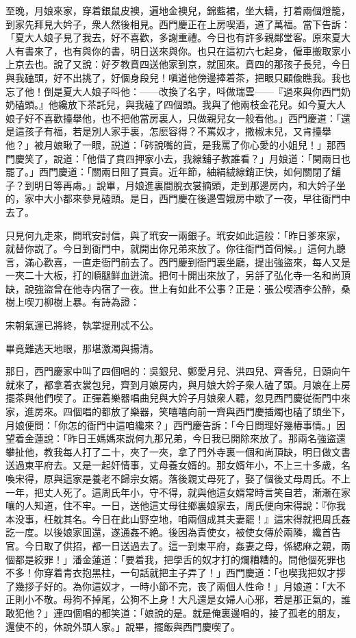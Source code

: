 至晚，月娘來家，穿着銀鼠皮襖，遍地金襖兒，錦藍裙，坐大轎，打着兩個燈籠，到家先拜見大妗子，衆人然後相見。西門慶正在上房喫酒，道了萬福。當下告訴：「夏大人娘子見了我去，好不喜歡，多謝重禮。今日也有許多親鄰堂客。原來夏大人有書來了，也有與你的書，明日送來與你。也只在這初六七起身，僱車搬取家小上京去也。說了又說：好歹教賁四送他家到京，就囬來。賁四的那孩子長兒，今日與我磕頭，好不出挑了，好個身段兒！嗔道他傍邊捧着茶，把眼只顧偸瞧我。我也忘了他！倒是夏大人娘子呌他：——改換了名字，呌做瑞雲——『過來與你西門奶奶磕頭。』他纔放下茶託兒，與我磕了四個頭。我與了他兩枝金花兒。如今夏大人娘子好不喜歡擡擧他，也不把他當房裏人，只做親兒女一般看他。」西門慶道：「還是這孩子有福，若是別人家手裏，怎麽容得？不罵奴才，撒椒末兒，又肯擡擧他？」被月娘瞅了一眼，説道：「硶說嘴的貨，是我罵了你心愛的小姐兒！」那西門慶笑了，說道：「他借了賁四押家小去，我線舖子教誰看？」月娘道：「関兩日也罷了。」西門慶道：「關兩日阻了買賣。近年節，紬絹絨線銷正快，如何關閉了舖子？到明日等再䖏。」說畢，月娘進裏間脫衣裳摘頭，走到那邊房内，和大妗子坐的，家中大小都來參見磕頭。是日，西門慶在後邊雪娥房中歇了一夜，早往衙門中去了。

只見何九走來，問玳安討信，與了玳安一兩銀子。玳安如此這般：「昨日爹來家，就替你説了。今日到衙門中，就開出你兄弟來放了。你往衙門首伺候。」這何九聽言，滿心歡喜，一直走衙門前去了。西門慶到衙門裏坐廳，提出強盜來，每人又是一夾二十大板，打的順腿鲜血迸流。把何十開出來放了，另㧱了弘化寺一名和尚頂缺，說強盜曾在他寺内宿了一夜。世上有如此不公事？正是：張公喫酒李公醉，桑樹上喫刀柳樹上暴。有詩為證：

\begin{myquote}
宋朝氣運已將終，執掌提刑忒不公。

畢竟難逃天地眼，那堪激濁與揚清。
\end{myquote}

那日，西門慶家中叫了四個唱的：吳銀兒、鄭愛月兒、洪四兒、齊香兒，日頭向午就來了，都拿着衣裳包兒，齊到月娘房内，與月娘大妗子衆人磕了頭。月娘在上房擺茶與他們喫了。正彈着樂器唱曲兒與大妗子月娘衆人聽，忽見西門慶従衙門中來家，進房來。四個唱的都放了樂器，笑嘻嘻向前一齊與西門慶插燭也磕了頭坐下，月娘便問：「你怎的衙門中這咱纔來？」西門慶告訴：「今日問理好幾樁事情。」因望着金蓮說：「昨日王媽媽來説何九那兄弟，今日我已開除來放了。那兩名強盜還攀扯他，教我每人打了二十，夾了一夾，拿了門外寺裏一個和尚頂缺，明日做文書送過東平府去。又是一起奸情事，丈母養女婿的。那女婿年小，不上三十多歲，名喚宋得，原與這家是養老不歸宗女婿。落後親丈母死了，娶了個後丈母周氏。不上一年，把丈人死了。這周氏年小，守不得，就與他這女婿常時言笑自若，漸漸在家嚷的人知道，住不牢。一日，送他這丈母往鄉裏娘家去，周氏便向宋得說：『你我本没事，枉躭其名。今日在此山野空地，咱兩個成其夫妻罷！』這宋得就把周氏姦訖一度。以後娘家囬還，遂通姦不絶。後因為責使女，被使女傳於兩隣，纔首告官。今日取了供招，都一日送過去了。這一到東平府，姦妻之母，係緦麻之親，兩個都是絞罪！」潘金蓮道：「要着我，把學舌的奴才打的爛糟糟的。問他個死罪也不多！你穿着青衣抱黑柱，一句話就把主子弄了！」西門慶道：「也喫我把奴才拶了幾拶子好的。為你這奴才，一時小節不完，丧了兩個人性命！」月娘道：「大不正則小不敬。母狗不掉尾，公狗不上身！大凡還是女婦人心邪，若是那正氣的，誰敢犯他？」連四個唱的都笑道：「娘說的是。就是俺裏邊唱的，接了孤老的朋友，還使不的，休說外頭人家。」說畢，擺飯與西門慶喫了。

